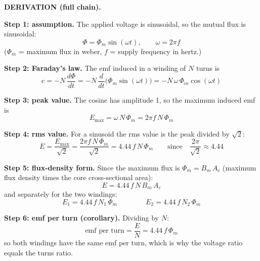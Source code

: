 \documentclass[11pt]{article}
\newcommand{\tagline}[1]{\textbf{\color{copper}#1}}
\begin{document}
\tagline{DERIVATION (full chain).}

\textbf{Step 1: assumption.} The applied voltage is sinusoidal, so the mutual flux is sinusoidal:
\[
\Phi = \Phi_m \sin(\omega t), \qquad \omega = 2\pi f
\]
($\Phi_m$ = maximum flux in weber, $f$ = supply frequency in hertz.)

\textbf{Step 2: Faraday's law.} The emf induced in a winding of $N$ turns is
\[
e = -N\,\frac{d\Phi}{dt}
  = -N\,\frac{d}{dt}\bigl(\Phi_m \sin(\omega t)\bigr)
  = -N\,\omega\,\Phi_m \cos(\omega t)
\]

\textbf{Step 3: peak value.} The cosine has amplitude 1, so the maximum induced emf is
\[
E_{\text{max}} = \omega\, N\, \Phi_m = 2\pi f\, N\, \Phi_m
\]

\textbf{Step 4: rms value.} For a sinusoid the rms value is the peak divided by $\sqrt{2}$:
\[
E = \frac{E_{\text{max}}}{\sqrt{2}}
  = \frac{2\pi f\, N\, \Phi_m}{\sqrt{2}}
  = 4.44\, f\, N\, \Phi_m
\qquad\text{since}\quad \frac{2\pi}{\sqrt{2}} \approx 4.44
\]

\textbf{Step 5: flux-density form.} Since the maximum flux is $\Phi_m = B_m\, A_c$ (maximum flux density times the core cross-sectional area):
\[
\boxed{\,E = 4.44\, f\, N\, B_m\, A_c\,}
\]
and separately for the two windings:
\[
E_1 = 4.44\, f\, N_1\, \Phi_m
\qquad\qquad
E_2 = 4.44\, f\, N_2\, \Phi_m
\]

\textbf{Step 6: emf per turn (corollary).} Dividing by $N$:
\[
\text{emf per turn} = \frac{E}{N} = 4.44\, f\, \Phi_m
\]
so both windings have the same emf per turn, which is why the voltage ratio equals the turns ratio.
\end{document}
